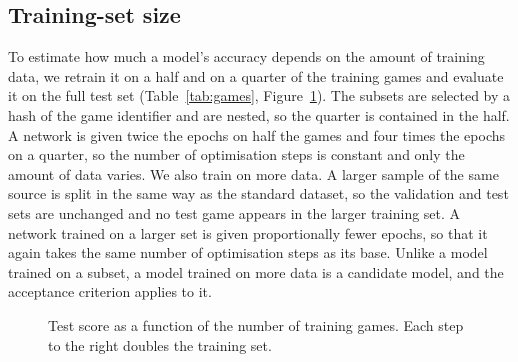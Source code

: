 \ifgames
\subsection{Training-set size}
\label{sec:training-size}

To estimate how much a model's accuracy depends on the amount of training
data, we retrain it on a half and on a quarter of the training games and
evaluate it on the full test set (Table~\ref{tab:games},
Figure~\ref{fig:games}). The subsets are selected by a hash of the game
identifier and are nested, so the quarter is contained in the half. A network
is given twice the epochs on half the games and four times the epochs on a
quarter, so the number of optimisation steps is constant and only the amount
of data varies.
\ifmore
We also train on more data. A larger sample of the same source is split in
the same way as the standard dataset, so the validation and test sets are
unchanged and no test game appears in the larger training set. A network
trained on a larger set is given proportionally fewer epochs, so that it
again takes the same number of optimisation steps as its base. Unlike a model
trained on a subset, a model trained on more data is a candidate model, and
the acceptance criterion applies to it.
\fi

\begin{table}[htbp]\centering\footnotesize
{}
\caption{Training-set size. Each model is trained on a fraction of the
training games\ifmore, or on a multiple of them from the larger sample,\fi{}
and evaluated on the full test set. The gain is paired with the same model
trained on the standard training set. A negative gain means that the model is
worse, and bold marks statistical significance.}
\label{tab:games}
\end{table}

\begin{figure}[htbp]\centering
{}
\caption{Test score as a function of the number of training games. Each step
to the right doubles the training set.}
\label{fig:games}
\end{figure}
\fi
